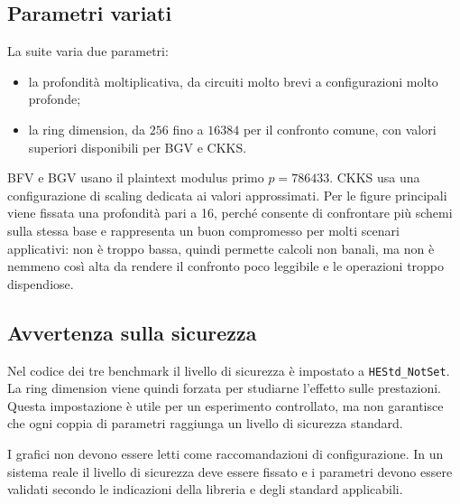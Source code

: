 \subsection{Parametri variati}
La suite varia due parametri:
\begin{itemize}
  \item la profondit\`a moltiplicativa, da circuiti molto brevi a configurazioni molto profonde;
  \item la ring dimension, da $256$ fino a $16384$ per il confronto comune, con valori superiori disponibili per BGV e CKKS.
\end{itemize}

BFV e BGV usano il plaintext modulus primo $p=786433$. CKKS usa una configurazione di scaling dedicata ai valori approssimati. Per le figure principali viene fissata una profondit\`a pari a 16, perch\'e consente di confrontare pi\`u schemi sulla stessa base e rappresenta un buon compromesso per molti scenari applicativi: non \`e troppo bassa, quindi permette calcoli non banali, ma non \`e nemmeno cos\`i alta da rendere il confronto poco leggibile e le operazioni troppo dispendiose.

\subsection{Avvertenza sulla sicurezza}
Nel codice dei tre benchmark il livello di sicurezza \`e impostato a \texttt{HEStd\_NotSet}. La ring dimension viene quindi forzata per studiarne l'effetto sulle prestazioni. Questa impostazione \`e utile per un esperimento controllato, ma non garantisce che ogni coppia di parametri raggiunga un livello di sicurezza standard.

I grafici non devono essere letti come raccomandazioni di configurazione. In un sistema reale il livello di sicurezza deve essere fissato e i parametri devono essere validati secondo le indicazioni della libreria e degli standard applicabili.

